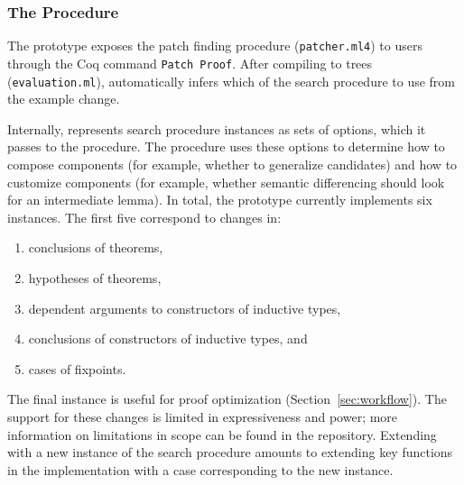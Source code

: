 \subsubsection{The Procedure}
\label{sec:pumpkin-impl-procedure}

The \sysname prototype exposes the patch finding procedure (\lstinline{patcher.ml4}) to users through the Coq command \lstinline{Patch Proof}. 
After compiling to trees (\lstinline{evaluation.ml}),
\sysname automatically infers which  of the search procedure to use from the example change. %


Internally, \sysname represents search procedure instances as sets of options,
which it passes to the procedure. The procedure uses these options to determine
how to compose components (for example, whether to generalize candidates) 
and how to customize components (for example, whether semantic differencing should look for an intermediate lemma).
In total, the \sysname prototype currently implements six instances.
The first five correspond to changes in:

\begin{enumerate}
\item conclusions of theorems,
\item hypotheses of theorems,
\item dependent arguments to constructors of inductive types, 
\item conclusions of constructors of inductive types, and
\item cases of fixpoints.
\end{enumerate}
The final instance is useful for proof optimization (Section~\ref{sec:workflow}).
The support for these changes is limited in expressiveness and power;
more information on limitations in scope can be found in the repository. %
Extending \sysname with a new instance of the search procedure amounts to extending key functions in the implementation
with a case corresponding to the new instance.

